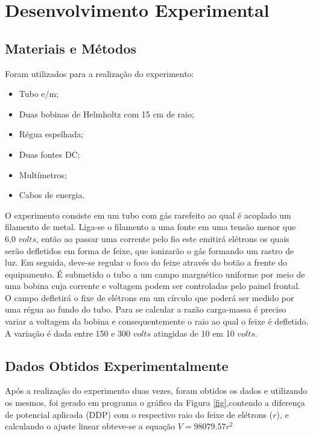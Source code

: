 \section{Desenvolvimento Experimental}
\subsection{Materiais e Métodos}
Foram utilizados para a realização do experimento:
\begin{itemize}
	\item Tubo e/m;
	\item Duas bobinas de Helmholtz com 15 cm de raio;
	\item Régua espelhada;
	\item Duas fontes DC;
	\item Multímetros;
	\item Cabos de energia.
\end{itemize}

O experimento consiste em um tubo com gás rarefeito  ao qual é acoplado um filamento de metal. Liga-se o filamento a uma fonte em uma tensão menor que 6,0 $volts$, então ao passar uma corrente pelo fio este emitirá elétrons os quais serão defletidos em forma de feixe, que ionizarão o gás formando um rastro de luz. Em seguida, deve-se regular o foco do feixe através do botão a frente do equipamento. É submetido o tubo a um campo margnético uniforme por meio de uma bobina cuja corrente e voltagem podem ser controladas pelo painel frontal. O campo defletirá o fixe de elétrons em um círculo que poderá ser medido por uma régua ao fundo do tubo. Para se calcular a razão carga-massa é preciso variar a voltagem da bobina e consequentemente o raio ao qual o feixe é defletido. A variação é dada entre 150 e 300 $volts$ atingidas de 10 em 10 $volts$.

\subsection{Dados Obtidos Experimentalmente}
Após a realização do experimento duas vezes, foram obtidos os dados e utilizando os mesmos, foi gerado em programa o gráfico da Figura \ref{fig},contendo a diferença de potencial aplicada (DDP) com o respectivo raio do feixe de elétrons ($r$), e calculando o ajuste linear obteve-se a equação $V = 98079.57r^2 $

